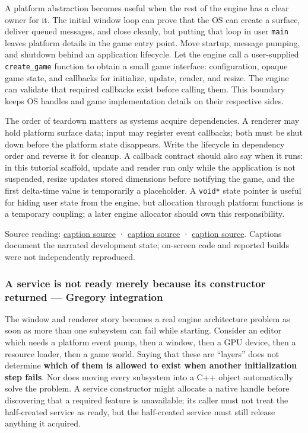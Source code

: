 A platform abstraction becomes useful when the rest of the engine has a clear owner for it. The initial window loop can prove that the OS can create a surface, deliver queued messages, and close cleanly, but putting that loop in user \texttt{main} leaves platform details in the game entry point. Move startup, message pumping, and shutdown behind an application lifecycle. Let the engine call a user-supplied \texttt{create\_game} function to obtain a small game interface: configuration, opaque game state, and callbacks for initialize, update, render, and resize. The engine can validate that required callbacks exist before calling them. This boundary keeps OS handles and game implementation details on their respective sides.

The order of teardown matters as systems acquire dependencies. A renderer may hold platform surface data; input may register event callbacks; both must be shut down before the platform state disappears. Write the lifecycle in dependency order and reverse it for cleanup. A callback contract should also say when it runs: in this tutorial scaffold, update and render run only while the application is not suspended, resize updates stored dimensions before notifying the game, and the first delta-time value is temporarily a placeholder. A \texttt{void*} state pointer is useful for hiding user state from the engine, but allocation through platform functions is a temporary coupling; a later engine allocator should own this responsibility.

Source reading: \href{https://www.youtube.com/watch?v=jEbqCf-MsZs}{caption source} · \href{https://www.youtube.com/watch?v=ojEPsZFPj2Q}{caption source} · \href{https://www.youtube.com/watch?v=nGgvWzoCsyk}{caption source}. Captions document the narrated development state; on-screen code and reported builds were not independently reproduced.

\subsubsection{A service is not ready merely because its constructor returned --- Gregory integration}\label{a-service-is-not-ready-merely-because-its-constructor-returned-gregory-integration}

The window and renderer story becomes a real engine architecture problem as soon as more than one subsystem can fail while starting. Consider an editor which needs a platform event pump, then a window, then a GPU device, then a resource loader, then a game world. Saying that these are ``layers'' does not determine \textbf{which of them is allowed to exist when another initialization step fails}. Nor does moving every subsystem into a C++ object automatically solve the problem. A service constructor might allocate a native handle before discovering that a required feature is unavailable; its caller must not treat the half-created service as ready, but the half-created service must still release anything it acquired.

